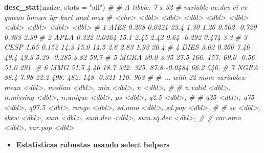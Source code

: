 \documentclass[
]{book}
\newenvironment{Shaded}{\begin{snugshade}}{\end{snugshade}}
\newcommand{\CommentTok}[1]{\textcolor[rgb]{0.56,0.35,0.01}{\textit{#1}}}
\newcommand{\DataTypeTok}[1]{\textcolor[rgb]{0.13,0.29,0.53}{#1}}
\newcommand{\KeywordTok}[1]{\textcolor[rgb]{0.13,0.29,0.53}{\textbf{#1}}}
\newcommand{\NormalTok}[1]{#1}
\newcommand{\StringTok}[1]{\textcolor[rgb]{0.31,0.60,0.02}{#1}}
\providecommand{\tightlist}{%
  \setlength{\itemsep}{0pt}\setlength{\parskip}{0pt}}
\numberwithin{equation}{section}
\begin{document}
\begin{Shaded}
\begin{Highlighting}[]
\KeywordTok{desc\_stat}\NormalTok{(maize, }\DataTypeTok{stats =} \StringTok{"all"}\NormalTok{)}
\CommentTok{\# \# A tibble: 7 x 32}
\CommentTok{\#   variable av.dev     ci    cv  gmean  hmean     iqr    kurt     mad    max}
\CommentTok{\#   \textless{}chr\textgreater{}     \textless{}dbl\textgreater{}  \textless{}dbl\textgreater{} \textless{}dbl\textgreater{}  \textless{}dbl\textgreater{}  \textless{}dbl\textgreater{}   \textless{}dbl\textgreater{}   \textless{}dbl\textgreater{}   \textless{}dbl\textgreater{}  \textless{}dbl\textgreater{}}
\CommentTok{\# 1 AIES      0.268 0.0221 23.4    1.30   1.26   0.502 {-}0.729    0.363   2.39}
\CommentTok{\# 2 APLA      0.322 0.0264 15.1    2.45   2.42   0.64  {-}0.292    0.474   3.3 }
\CommentTok{\# 3 CESP      1.65  0.152  14.3   15.0   14.5    2.6    2.83     1.93   20.4 }
\CommentTok{\# 4 DIES      3.02  0.260   7.46  49.4   49.3    5.29  {-}0.285    3.82   59.7 }
\CommentTok{\# 5 MGRA     39.0   3.35   27.5  166.   157.    69.0   {-}0.56    51.0   291.  }
\CommentTok{\# 6 MMG      51.5   4.46   18.7  332.   325.    87.8   {-}0.0484  66.2   546.  }
\CommentTok{\# 7 NGRA     88.4   7.98   22.2  498.   482.   148.     0.321  110.    903   }
\CommentTok{\# \# ... with 22 more variables: mean \textless{}dbl\textgreater{}, median \textless{}dbl\textgreater{}, min \textless{}dbl\textgreater{}, n \textless{}dbl\textgreater{},}
\CommentTok{\# \#   n.valid \textless{}dbl\textgreater{}, n.missing \textless{}dbl\textgreater{}, n.unique \textless{}dbl\textgreater{}, ps \textless{}dbl\textgreater{}, q2.5 \textless{}dbl\textgreater{},}
\CommentTok{\# \#   q25 \textless{}dbl\textgreater{}, q75 \textless{}dbl\textgreater{}, q97.5 \textless{}dbl\textgreater{}, range \textless{}dbl\textgreater{}, sd.amo \textless{}dbl\textgreater{}, sd.pop \textless{}dbl\textgreater{},}
\CommentTok{\# \#   se \textless{}dbl\textgreater{}, skew \textless{}dbl\textgreater{}, sum \textless{}dbl\textgreater{}, sum.dev \textless{}dbl\textgreater{}, sum.sq.dev \textless{}dbl\textgreater{},}
\CommentTok{\# \#   var.amo \textless{}dbl\textgreater{}, var.pop \textless{}dbl\textgreater{}}
\end{Highlighting}
\end{Shaded}

\begin{itemize}
\tightlist
\item
  \textbf{Estatísticas robustas usando select helpers}
\end{itemize}
\end{document}
